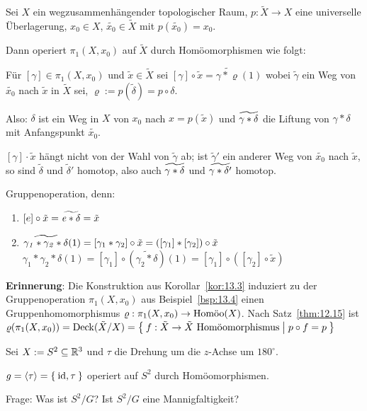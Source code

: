 \begin{beispiel}\label{bsp:13.4}%
    Sei $X$ ein wegzusammenhängender topologischer Raum, $p: \tilde{X} \rightarrow X$
    eine universelle Überlagerung, $x_0 \in X$, $\tilde{x_0} \in \tilde{X}$ mit
    $p(\tilde{x_0}) = x_0$.

    Dann operiert $\pi_1(X, x_0)$ auf $\tilde{X}$ durch Homöomorphismen wie folgt:

    Für $[\gamma] \in \pi_1(X, x_0)$ und $\tilde{x} \in \tilde{X}$ sei
    $[\gamma] \circ \tilde{x} = \tilde{\gamma * \varrho} (1)$ wobei
    $\tilde{\gamma}$ ein Weg von $\tilde{x_0}$ nach $\tilde{x}$ in
    $\tilde{X}$ sei, $\varrho := p(\tilde{\delta}) = p \circ \delta$.

    Also: $\delta$ ist ein Weg in $X$ von $x_0$ nach $x=p(\tilde{x})$
    und $\rtilde{\gamma * \delta}$ die Liftung von $\gamma * \delta$
    mit Anfangspunkt $\tilde{x_0}$.

    $[\gamma] \cdot \tilde{x}$ hängt nicht von der Wahl von $\tilde{\gamma}$
    ab; ist $\tilde{\gamma}'$ ein anderer Weg von $\tilde{x_0}$ nach
    $\tilde{x}$, so sind $\tilde{\delta}$ und $\tilde{\delta}'$ homotop,
    also auch $\rtilde{\gamma * \delta}$ und $\rtilde{\gamma * \delta'}$
    homotop.

    Gruppenoperation, denn:
    \begin{enumerate}[label=\roman*)]
        \item $[e] \circ \tilde{x} = \rtilde{e * \delta} = \tilde{x}$
        \item $\rtilde{\gamma_1 * \gamma_2 * \delta}(1) = [\gamma_1 * \gamma_2] \circ \tilde{x} = ([\gamma_1] * [\gamma_2]) \circ \tilde{x}$\\
              $\gamma_1 * \gamma_2 * \delta(1) = [\gamma_1] \circ (\tilde{\gamma_2 * \delta})(1) = [\gamma_1] \circ ([\gamma_2] \circ \tilde{x})$ 
    \end{enumerate}
\end{beispiel}

\textbf{Erinnerung}:%
Die Konstruktion aus Korollar~\ref{kor:13.3} induziert zu der Gruppenoperation
$\pi_1(X, x_0)$ aus Beispiel~\ref{bsp:13.4} einen Gruppenhomomorphismus
$\varrho: \pi_1(X, x_0) \rightarrow \Homoo(X)$. Nach Satz~\ref{thm:12.15}
ist $\varrho(\pi_1(X, x_0)) = \Deck(\tilde{X} / X) = \Set{f: \tilde{X} \rightarrow \tilde{X} \text{ Homöomorphismus} | p \circ f = p}$

\begin{beispiel}%
    Sei $X := S^2 \subseteq \mdr^3$ und $\tau$ die Drehung um die $z$-Achse
    um $180^\circ$.

    $g = \langle \tau \rangle = \Set{\id, \tau}$ operiert auf $S^2$
    durch Homöomorphismen.

    Frage: Was ist $S^2 / G$? Ist $S^2 / G$ eine Mannigfaltigkeit?
\end{beispiel}



